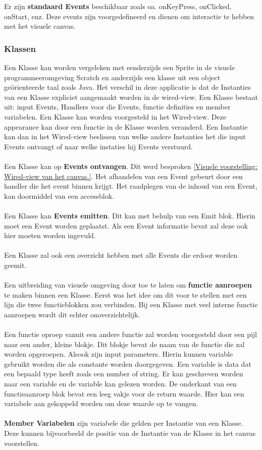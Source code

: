 \documentclass[]{article}
\begin{document}
Er zijn \textbf{standaard Events} beschikbaar zoals oa. onKeyPress, onClicked, onStart, enz. Deze events zijn voorgedefineerd en dienen om interactie te hebben met het visuele canvas.  
\subsubsection{Klassen}
\label{Klassen}
Een Klasse kan worden vergeleken met eenderzijds een Sprite in de visuele programmeeromgeving Scratch \cite{scratch} en anderzijds een klasse uit een object ge\"{o}rienteerde taal zoals Java. Het verschil in deze applicatie is dat de Instanties van een Klasse expliciet aangemaakt worden in de wired-view. Een Klasse bestaat uit: input Events, Handlers voor die Events, functie definities en member variabelen. Een Klasse kan worden voorgesteld in het Wired-view. Deze appearance kan door een functie in de Klasse worden veranderd. Een Instantie kan dan in het Wired-view beslissen van welke andere Instanties het die input Events ontvangt of naar welke instaties hij Events verstuurd. \\\\ Een Klasse kan op \textbf{Events ontvangen}. Dit werd besproken \ref{Visuele voorstelling: Wired-view van het canvas.}. Het afhandelen van een Event gebeurt door een handler die het event binnen krijgt. Het raadplegen van de inhoud van een Event, kan doormiddel van een accessblok. \\\\Een Klasse kan \textbf{Events emitten}. Dit kan met behulp van een Emit blok. Hierin moet een Event worden geplaatst. Als een Event informatie bevat zal deze ook hier moeten worden ingevuld. \\\\Een Klasse zal ook een overzicht hebben met alle Events die erdoor worden geemit.\\\\Een uitbreiding van visuele omgeving door toe te laten om \textbf{functie aanroepen} te maken binnen een Klasse. Eerst was het idee om dit voor te stellen met een lijn die twee functieblokken zou verbinden. Bij een Klasse met veel interne functie aanroepen wordt dit echter onoverzichtelijk.\\\\Een functie oproep vanuit een andere functie zal worden voorgesteld door een pijl naar een ander, kleine blokje. Dit blokje bevat de naam van de functie die zal worden opgeroepen. Alsook zijn input parameters. Hierin kunnen variable gebruikt worden die als constante worden doorgegeven. Een variable is data dat een bepaald type heeft zoals een number of string. Er kan geschreven worden naar een variable en de variable kan gelezen worden. De onderkant van een functieaanroep blok bevat een leeg vakje voor de return waarde. Hier kan een variabele aan gekoppeld worden om deze waarde op te vangen.\\\\\textbf{Member Variabelen} zijn variabele die gelden per Instantie van een Klasse. Deze kunnen bijvoorbeeld de positie van de Instantie van de Klasse in het canvas voorstellen.
\end{document}
